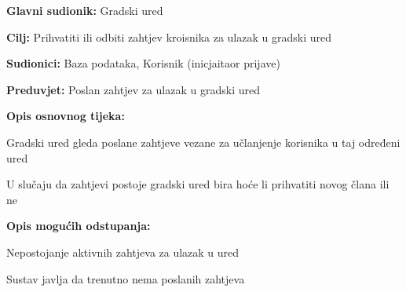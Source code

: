 					\noindent {}
					\begin{packed_item}
	
						\item \textbf{Glavni sudionik: }Gradski ured
						\item  \textbf{Cilj:} Prihvatiti ili odbiti zahtjev kroisnika za ulazak u  gradski ured
						\item  \textbf{Sudionici:} Baza podataka, Korisnik (inicjaitaor prijave)
						\item  \textbf{Preduvjet:} Poslan zahtjev za ulazak u gradski ured
						\item  \textbf{Opis osnovnog tijeka:}
						
						\item[] \begin{packed_enum}
	
							\item Gradski ured gleda poslane zahtjeve vezane za učlanjenje korisnika u taj određeni ured
							\item U slučaju da zahtjevi postoje gradski ured bira hoće li prihvatiti novog člana ili ne

						\end{packed_enum}
						
						\item  \textbf{Opis mogućih odstupanja:}
						
						\item[] \begin{packed_item}
	
							\item[1.a] Nepostojanje aktivnih zahtjeva za ulazak u ured
							\item[] \begin{packed_enum}
								
								\item Sustav javlja da trenutno nema poslanih zahtjeva	
							\end{packed_enum}
						\end{packed_item}
						
					\end{packed_item}
					
